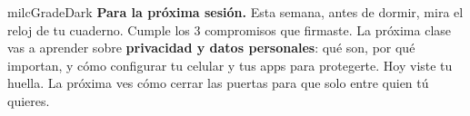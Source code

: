 \documentclass[11pt,letterpaper]{article}
\begin{document}
\begin{infoband}{milcGradeDark}
\textbf{Para la próxima sesión.} Esta semana, antes de dormir, mira el reloj de tu cuaderno. Cumple los 3 compromisos que firmaste. La próxima clase vas a aprender sobre \textbf{privacidad y datos personales}: qué son, por qué importan, y cómo configurar tu celular y tus apps para protegerte. Hoy viste tu huella. La próxima ves cómo cerrar las puertas para que solo entre quien tú quieres.
\end{infoband}
\end{document}
